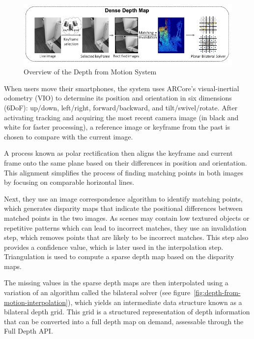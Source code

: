 \begin{figure}[ht!]
    \centering
    \includegraphics[width=\linewidth]{images/DepthFromMotion}
    \caption{Overview of the Depth from Motion System}
\end{figure}
When users move their smartphones, the system uses ARCore's visual-inertial odometry (VIO)
to determine its position and orientation in six dimensions (6DoF): up/down, left/right, forward/backward, and tilt/swivel/rotate.
After activating tracking and acquiring the most recent camera image (in black and white for faster processing),
a reference image or keyframe from the past is chosen to compare with the current image.

A process known as polar rectification then aligns the keyframe and current frame onto the same plane based on their differences in position and orientation.
This alignment simplifies the process of finding matching points in both images by focusing on comparable horizontal lines.

Next, they use an image correspondence algorithm to identify matching points,
which generates disparity maps that indicate the positional differences between matched points in the two images.
As scenes may contain low textured objects or repetitive patterns which can lead to incorrect matches,
they use an invalidation step, which removes points that are likely to be incorrect matches.
This step also provides a confidence value, which is later used in the interpolation step.
Triangulation is used to compute a sparse depth map based on the disparity maps.

The missing values in the sparse depth maps are then interpolated using a variation of an algorithm called the bilateral solver (see figure~\ref{fig:depth-from-motion-interpolation}),
which yields an intermediate data structure known as a bilateral depth grid.
This grid is a structured representation of depth information that can be converted into a full depth map on demand,
assessable through the Full Depth API\@.

